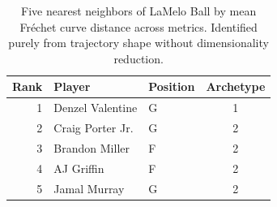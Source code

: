 \begin{table}[htbp]
  \centering\small
  \begin{tabular}{rllc}
    \toprule
    Rank & Player & Position & Archetype \\
    \midrule
    1 & Denzel Valentine & G & 1 \\
    2 & Craig Porter Jr. & G & 2 \\
    3 & Brandon Miller & F & 2 \\
    4 & AJ Griffin & F & 2 \\
    5 & Jamal Murray & G & 2 \\
    \bottomrule
  \end{tabular}
  \caption{Five nearest neighbors of LaMelo Ball by mean Fr\'{e}chet curve distance across metrics. Identified purely from trajectory shape without dimensionality reduction.}
  \label{tab:LaMelo_Ball_frechet_curve_neighbors}
\end{table}

